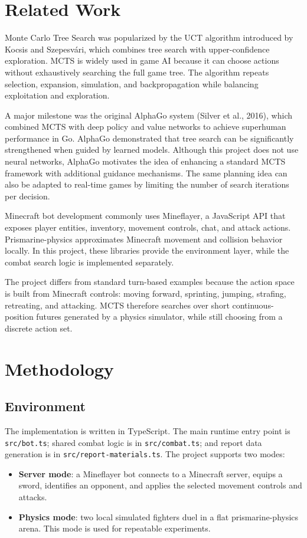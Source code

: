 \documentclass[11pt]{article}
\begin{document}
\section{Related Work}

Monte Carlo Tree Search was popularized by the UCT algorithm introduced by Kocsis and Szepesvári, which combines tree search with upper-confidence exploration. MCTS is widely used in game AI because it can choose actions without exhaustively searching the full game tree. The algorithm repeats selection, expansion, simulation, and backpropagation while balancing exploitation and exploration.

A major milestone was the original AlphaGo system (Silver et al., 2016), which combined MCTS with deep policy and value networks to achieve superhuman performance in Go. AlphaGo demonstrated that tree search can be significantly strengthened when guided by learned models. Although this project does not use neural networks, AlphaGo motivates the idea of enhancing a standard MCTS framework with additional guidance mechanisms. The same planning idea can also be adapted to real-time games by limiting the number of search iterations per decision.

Minecraft bot development commonly uses Mineflayer, a JavaScript API that exposes player entities, inventory, movement controls, chat, and attack actions. Prismarine-physics approximates Minecraft movement and collision behavior locally. In this project, these libraries provide the environment layer, while the combat search logic is implemented separately.

The project differs from standard turn-based examples because the action space is built from Minecraft controls: moving forward, sprinting, jumping, strafing, retreating, and attacking. MCTS therefore searches over short continuous-position futures generated by a physics simulator, while still choosing from a discrete action set.

\section{Methodology}

\subsection{Environment}

The implementation is written in TypeScript. The main runtime entry point is \texttt{src/bot.ts}; shared combat logic is in \texttt{src/combat.ts}; and report data generation is in \texttt{src/report-materials.ts}. The project supports two modes:
\begin{itemize}
  \item \textbf{Server mode}: a Mineflayer bot connects to a Minecraft server, equips a sword, identifies an opponent, and applies the selected movement controls and attacks.
  \item \textbf{Physics mode}: two local simulated fighters duel in a flat prismarine-physics arena. This mode is used for repeatable experiments.
\end{itemize}
\end{document}
